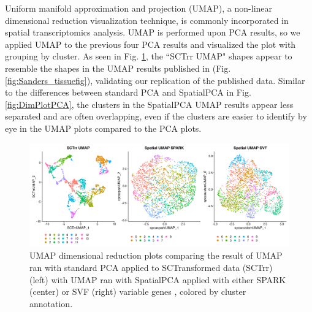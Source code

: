 \documentclass{article}
\begin{document}
Uniform manifold approximation and projection (UMAP)\citep{mcinnes_umap_2020}, a non-linear dimensional reduction visualization technique, is commonly incorporated in spatial transcriptomics analysis. UMAP is performed upon PCA results, so we applied UMAP to the previous four PCA results and visualized the plot with grouping by cluster. As seen in Fig. \ref{fig:DimPlotUMAP}, the ``SCTrr UMAP" shapes appear to resemble the shapes in the UMAP results published in \citet{sanders_small_2022} (Fig. \ref{fig:Sanders_tissuefig}), validating our replication of the published data. Similar to the differences between standard PCA and SpatialPCA in Fig. \ref{fig:DimPlotPCA}, the clusters in the SpatialPCA UMAP results appear less separated and are often overlapping, even if the clusters are easier to identify by eye in the UMAP plots compared to the PCA plots.

\begin{figure}[h!]
    \centering
    \includegraphics[width=\textwidth]{images/DimPlotUMAP_D_GTFB1170_SmallCellOvarianCancer_pw_strip.png}
    \caption{UMAP dimensional reduction plots comparing the result of UMAP ran with standard PCA applied to SCTransformed data (SCTrr) (left) with UMAP ran with SpatialPCA applied with either SPARK (center) or SVF (right) variable genes , colored by cluster annotation.}
    \label{fig:DimPlotUMAP}
\end{figure}
\end{document}
